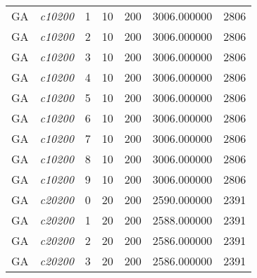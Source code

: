 {\begin{longtable}{cc|c|cc|cc}
			GA                 & \textit{c10200}    & 1                               & 10               & 200              & 3006.000000                          & 2806 \\  
			GA                 & \textit{c10200}    & 2                               & 10               & 200              & 3006.000000                          & 2806 \\  
			GA                 & \textit{c10200}    & 3                               & 10               & 200              & 3006.000000                          & 2806 \\  
			GA                 & \textit{c10200}    & 4                               & 10               & 200              & 3006.000000                          & 2806 \\  
			GA                 & \textit{c10200}    & 5                               & 10               & 200              & 3006.000000                          & 2806 \\  
			GA                 & \textit{c10200}    & 6                               & 10               & 200              & 3006.000000                          & 2806 \\  
			GA                 & \textit{c10200}    & 7                               & 10               & 200              & 3006.000000                          & 2806 \\  
			GA                 & \textit{c10200}    & 8                               & 10               & 200              & 3006.000000                          & 2806 \\  
			GA                 & \textit{c10200}    & 9                               & 10               & 200              & 3006.000000                          & 2806 \\  \hline
			GA                 & \textit{c20200}    & 0                               & 20               & 200              & 2590.000000                          & 2391 \\  
			GA                 & \textit{c20200}    & 1                               & 20               & 200              & 2588.000000                          & 2391 \\  
			GA                 & \textit{c20200}    & 2                               & 20               & 200              & 2586.000000                          & 2391 \\  
			GA                 & \textit{c20200}    & 3                               & 20               & 200              & 2586.000000                          & 2391 \\  

\end{longtable}}
